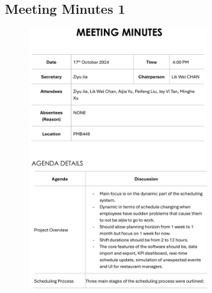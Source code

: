 \documentclass[a4paper,12pt, oneside]{report}
\begin{document}
\begin{appendices}
\section{Meeting Minutes 1}
\begin{figure}[H]
    \centering
    \includegraphics[width=0.7\textwidth]{Minutes/Minutes_1-cropped-1.png}
\end{figure}
\newpage
\begin{figure}[H]
    \centering

\end{figure}
\end{appendices}
\end{document}
